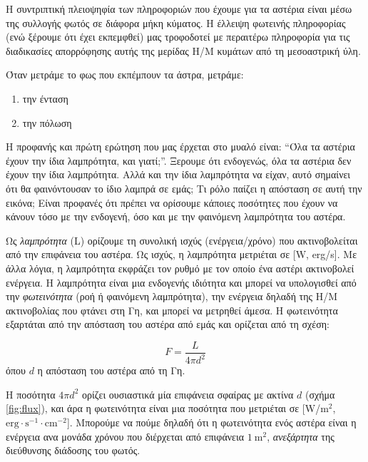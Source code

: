 Η συντριπτική πλειοψηφία των πληροφοριών που έχουμε για τα αστέρια είναι μέσω της συλλογής φωτός σε διάφορα μήκη κύματος. Η έλλειψη φωτεινής πληροφορίας (ενώ ξέρουμε ότι έχει εκπεμφθεί) μας τροφοδοτεί με περαιτέρω πληροφορία για τις διαδικασίες απορρόφησης αυτής της μερίδας Η/Μ κυμάτων από τη μεσοαστρική ύλη.

Όταν μετράμε το φως που εκπέμπουν τα άστρα, μετράμε:
\begin{enumerate}
    \item την ένταση
    \item την πόλωση
\end{enumerate}

Η προφανής και πρώτη ερώτηση που μας έρχεται στο μυαλό είναι:
``Όλα τα αστέρια έχουν την ίδια λαμπρότητα, και γιατί;''. Ξερουμε ότι ενδογενώς, όλα τα αστέρια δεν έχουν την ίδια λαμπρότητα. Αλλά και την ίδια λαμπρότητα να είχαν, αυτό σημαίνει ότι θα φαινόντουσαν το ίδιο λαμπρά σε εμάς; Τι ρόλο παίζει η απόσταση σε αυτή την εικόνα; Είναι προφανές ότι πρέπει να ορίσουμε κάποιες ποσότητες που έχουν να κάνουν τόσο με την ενδογενή, όσο και με την φαινόμενη λαμπρότητα του αστέρα.

Ως \textit{λαμπρότητα} (L) ορίζουμε τη συνολική ισχύς (ενέργεια/χρόνο) που ακτινοβολείται από την επιφάνεια του αστέρα. Ως ισχύς, η λαμπρότητα μετριέται σε [W, erg/s]. Με άλλα λόγια, η λαμπρότητα εκφράζει τον ρυθμό με τον οποίο ένα αστέρι ακτινοβολεί ενέργεια. Η λαμπρότητα είναι μια ενδογενής ιδιότητα και μπορεί να υπολογισθεί από την \textit{φωτεινότητα} (ροή ή φαινόμενη λαμπρότητα), την ενέργεια δηλαδή της Η/Μ ακτινοβολίας που φτάνει στη Γη, και μπορεί να μετρηθεί άμεσα. Η φωτεινότητα εξαρτάται από την απόσταση του αστέρα από εμάς και ορίζεται από τη σχέση:

\begin{equation}
    F = \frac{L}{4 \pi d^2}
\end{equation}
όπου $d$ η απόσταση του αστέρα από τη Γη.

Η ποσότητα $4 \pi d^2$ ορίζει ουσιαστικά μία επιφάνεια σφαίρας με ακτίνα $d$ (σχήμα \ref{fig:flux}), και άρα η φωτεινότητα είναι μια ποσότητα που μετριέται σε [W/$\text{m}^2$, $\text{erg} \cdot \text{s}^{-1} \cdot \text{cm}^{-2}$]. Μπορούμε να πούμε δηλαδή ότι η φωτεινότητα ενός αστέρα είναι η ενέργεια ανα μονάδα χρόνου που διέρχεται από επιφάνεια $1 \ \text{m}^2$, \textit{ανεξάρτητα} της διεύθυνσης διάδοσης του φωτός.

